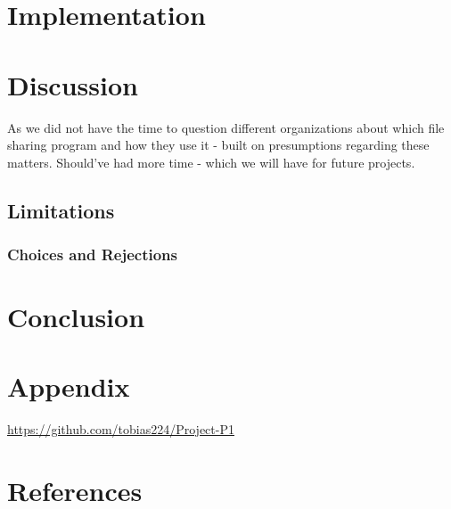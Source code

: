 \documentclass[12pt,a4paper]{article}
\begin{document}
\section{Implementation}
\label{implementation}



\clearpage
\section{Discussion}
\label{discussion}
As we did not have the time to question different organizations about which file sharing program and how they use it - built on presumptions regarding these matters. Should've had more time - which we will have for future projects.  

\subsection{Limitations}
\label{limitations}


\subsubsection{Choices and Rejections}

\clearpage

\section{Conclusion}
\label{sec:conclusion}


\clearpage
\section{Appendix}
\url{https://github.com/tobias224/Project-P1}
\clearpage
\section{References}


\end{document}
